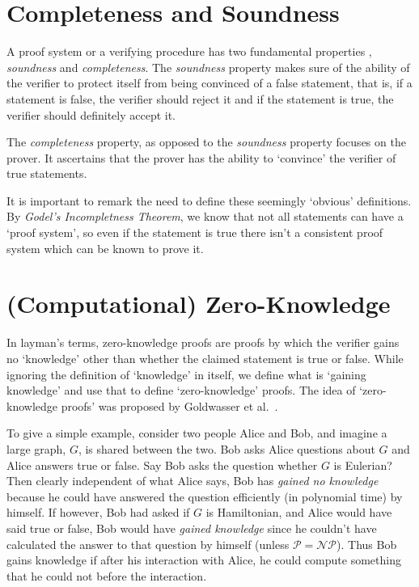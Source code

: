 \documentclass[12pt]{article}
\begin{document}
	\section{Completeness and Soundness}
	A proof system or a verifying procedure has two fundamental properties \cite{Goldreich_2001}, \emph{soundness} and \emph{completeness}.  The \emph{soundness} property makes sure
	of the ability of the verifier to protect itself from being convinced of a false statement, that is, if a statement is false, the verifier should reject it and if the statement is true, the verifier should definitely accept it. 
	
	The \emph{completeness} property, as opposed to the \emph{soundness} property focuses on the prover.  It ascertains that the prover has the ability to `convince' the verifier of true statements.
	
	It is important to remark the need to define these seemingly `obvious' definitions.  By \emph{Godel's Incompletness Theorem}, we know that not all statements can have a `proof system', so even if the statement is true there isn't a consistent proof system which can be known to prove it.
	
	\section{(Computational) Zero-Knowledge}
	
	In layman's terms, zero-knowledge proofs are proofs by which the verifier gains no `knowledge' other than whether the claimed statement is true or false.   While ignoring the definition of `knowledge' in itself, we define what is `gaining knowledge' and use that to define `zero-knowledge' proofs.  The idea of `zero-knowledge proofs' was proposed by Goldwasser et al.\ \cite{goldwasser2019knowledge}.
	
	To give a simple example, consider two people Alice and Bob, and imagine a large graph, $G$, is shared between the two.  Bob asks Alice questions about $G$ and Alice answers true or false.  Say Bob asks the question whether $G$ is Eulerian? Then clearly independent of what Alice says, Bob has \emph{gained no knowledge} because he could have answered the question efficiently (in polynomial time) by himself.  If however, Bob had asked if $G$ is Hamiltonian, and Alice would have said true or false, Bob would have \emph{gained knowledge} since he couldn't have calculated the answer to that question by himself (unless $\mathcal{P} = \mathcal{NP}$).  Thus Bob gains knowledge if after his interaction with Alice, he could compute something that he could not before the interaction.
	
\end{document}
